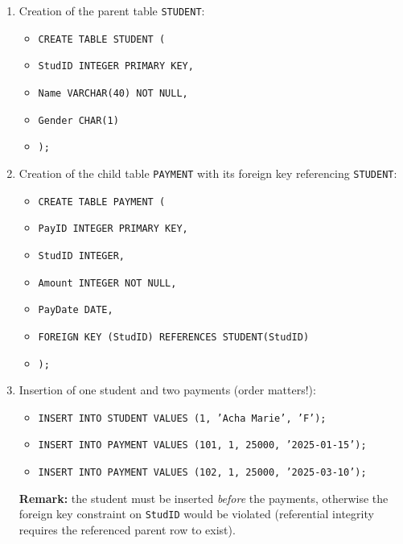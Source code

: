 \documentclass[11pt]{article}
\begin{document}
\begin{corrige}
\begin{enumerate}
\item Creation of the parent table \texttt{STUDENT}:
\begin{itemize}
\item \texttt{CREATE TABLE STUDENT (}
\item \texttt{\quad StudID INTEGER PRIMARY KEY,}
\item \texttt{\quad Name VARCHAR(40) NOT NULL,}
\item \texttt{\quad Gender CHAR(1)}
\item \texttt{);}
\end{itemize}
\item Creation of the child table \texttt{PAYMENT} with its foreign key referencing \texttt{STUDENT}:
\begin{itemize}
\item \texttt{CREATE TABLE PAYMENT (}
\item \texttt{\quad PayID INTEGER PRIMARY KEY,}
\item \texttt{\quad StudID INTEGER,}
\item \texttt{\quad Amount INTEGER NOT NULL,}
\item \texttt{\quad PayDate DATE,}
\item \texttt{\quad FOREIGN KEY (StudID) REFERENCES STUDENT(StudID)}
\item \texttt{);}
\end{itemize}
\item Insertion of one student and two payments (order matters!):
\begin{itemize}
\item \texttt{INSERT INTO STUDENT VALUES (1, 'Acha Marie', 'F');}
\item \texttt{INSERT INTO PAYMENT VALUES (101, 1, 25000, '2025-01-15');}
\item \texttt{INSERT INTO PAYMENT VALUES (102, 1, 25000, '2025-03-10');}
\end{itemize}
\textbf{Remark:} the student must be inserted \emph{before} the payments, otherwise the foreign key constraint on \texttt{StudID} would be violated (referential integrity requires the referenced parent row to exist).
\end{enumerate}
\end{corrige}
\end{document}
